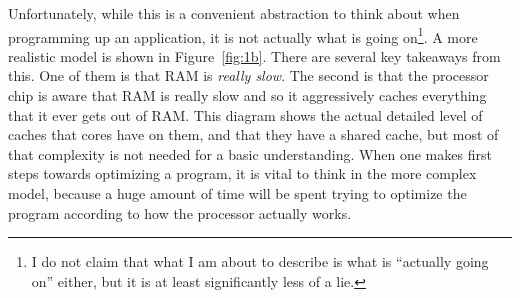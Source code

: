 Unfortunately, while this is a convenient abstraction to think about when programming up an application, it
is not actually what is going on\footnote{I do not claim that what I am about to describe is what is ``actually going on'' either,
but it is at least significantly less of a lie.}. A more realistic model is shown in Figure~\ref{fig:1b}. There are
several key takeaways from this. One of them is that RAM is \textit{really slow}. The second is that the processor
chip is aware that RAM is really slow and so it aggressively caches everything that it ever gets out of RAM. This diagram
shows the actual detailed level of caches that cores have on them, and that they have a shared cache, but most of that
complexity is not needed for a basic understanding. When one makes first steps towards optimizing a program, it is vital
to think in the more complex model, because a huge amount of time will be spent trying to optimize the program according
to how the processor actually works.

